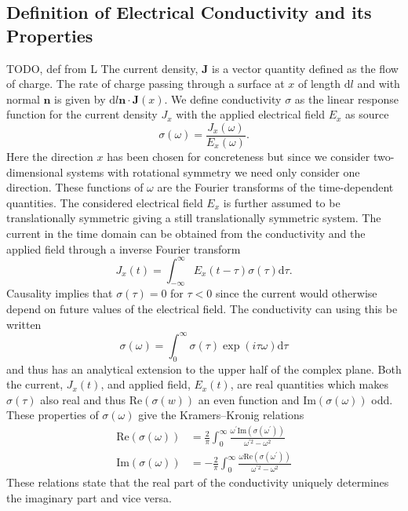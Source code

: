 \documentclass[12pt]{report}
\renewcommand{\d}{\ensuremath{\mathrm{d}}}
\renewcommand{\i}{\ensuremath{i}}
\newcommand{\re}{\ensuremath{\mathrm{Re}}}
\newcommand{\im}{\ensuremath{\mathrm{Im}}}
\begin{document}
\subsection{Definition of Electrical Conductivity and its Properties}
TODO, def from L
The current density, $\mathbf{J}$ is a vector quantity defined as the flow of charge. The rate of charge passing through a surface at $x$ of length $\d l$ and with normal $\mathbf{n}$ is given by $\d l\mathbf{n}\cdot \mathbf{J}(x)$.
We define conductivity $\sigma$ as the linear response function for the current density $J_x$ with the applied electrical field $E_x$ as source
\begin{equation}
 \sigma(\omega)=\frac{J_x(\omega)}{E_x(\omega)}\label{sigma}.
\end{equation}
Here the direction $x$ has been chosen for concreteness but since we consider two-dimensional systems with rotational symmetry we need only consider one direction. These functions of $\omega$ are the Fourier transforms of the time-dependent quantities. The considered electrical field $E_x$ is further assumed to be translationally symmetric giving a still translationally symmetric system. The current in the time domain can be obtained from the conductivity and the applied field through a inverse Fourier transform
\begin{equation}
 J_x(t)=\int_{-\infty}^\infty E_x(t-\tau)\sigma(\tau)\d \tau.
\end{equation}
Causality implies that $\sigma(\tau)=0$ for $\tau<0$ since the current would otherwise depend on future values of the electrical field. The conductivity can using this be written
\begin{equation}
 \sigma(\omega)=\int_0^\infty\sigma(\tau)\exp(\i\tau\omega)\d\tau
\end{equation}
and thus has an analytical extension to the upper half of the complex plane. Both the current, $J_x(t)$, and applied field, $E_x(t)$, are real quantities which makes $\sigma(\tau)$ also real and thus $\re(\sigma(w))$ an even function and $\im(\sigma(\omega))$ odd. These properties of $\sigma(\omega)$ give the Kramers–Kronig relations
\begin{equation}
\begin{split}
 \re(\sigma(\omega))&=\frac{2}{\pi}\int_0^\infty\frac{\omega^\prime\im(\sigma(\omega^\prime))}{\omega^{\prime 2}-\omega^2}\\
\im(\sigma(\omega))&=-\frac{2}{\pi}\int_0^\infty\frac{\omega\re(\sigma(\omega^\prime))}{\omega^{\prime 2}-\omega^2}\label{kk}
\end{split}
\end{equation}
These relations state that the real part of the conductivity uniquely determines the imaginary part and vice versa.
\end{document}
